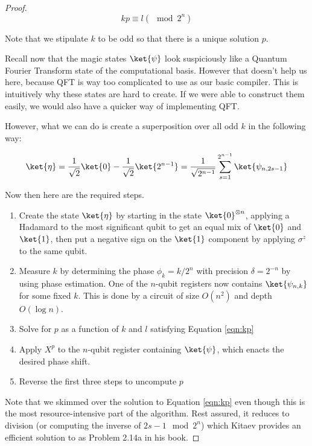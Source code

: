 \begin{proof}
\begin{equation}
\label{eqn:kp}
kp \equiv l (\mod 2^n)
\end{equation}

Note that we stipulate $k$ to be odd so that there is a unique solution $p$.

Recall now that the magic states $\ket{\psi}$ look suspiciously like a
Quantum Fourier Transform state of the computational basis.
However that doesn't help us here, because QFT is way too complicated to use as
our basic compiler. This is intuitively why these states are hard to create.
If we were able to construct them easily, we would also have a quicker way
of implementing QFT.

However, what we can do is create a superposition over all odd $k$ in the
following way:

\begin{equation}
\ket{\eta} = \normtwo \ket{0} - \normtwo \ket{2^{n-1}} =
\frac{1}{\sqrt{2^{n-1}}} \sum_{s=1}^{2^{n-1}} \ket{\psi_{n,2s-1}}
\end{equation}

Now then here are the required steps.

\begin{enumerate}
\item Create the state $\ket{\eta}$ by starting in the state $\ket{0}^{\otimes n}$,
applying a Hadamard to the most significant qubit to get an equal mix of $\ket{0}$
and $\ket{1}$, then put a negative sign on the $\ket{1}$ component by applying
$\sigma^z$ to the same qubit.
\item Measure $k$ by determining the phase $\phi_k = k/2^n$ with precision
$\delta = 2^{-n}$ by using phase estimation. One of the $n$-qubit registers
now contains $\ket{\psi_{n,k}}$ for some fixed $k$.
This is done by a circuit of size $O(n^2)$ and depth $O(\log n)$.
\item Solve for $p$ as a function of $k$ and $l$ satisfying Equation \ref{eqn:kp}
\item Apply $X^p$ to the $n$-qubit register containing $\ket{\psi}$, which
enacts the desired phase shift.
\item Reverse the first three steps to uncompute $p$
\end{enumerate}

Note that we skimmed over the solution to Equation \ref{eqn:kp} even though this
is the most resource-intensive part of the algorithm. Rest assured, it reduces
to division (or computing the inverse of $2s-1 \mod 2^n$) which Kitaev
provides an efficient solution to as Problem 2.14a in his book.

\end{proof}
